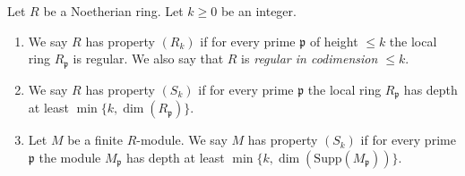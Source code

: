 \begin{definition}
\label{definition-conditions}
Let $R$ be a Noetherian ring.
Let $k \geq 0$ be an integer.
\begin{enumerate}
\item We say $R$ has property {\it $(R_k)$} if for every prime $\mathfrak p$
of height $\leq k$ the local ring $R_{\mathfrak p}$ is regular.
We also say that $R$ is {\it regular in codimension $\leq k$}.
\item We say $R$ has property {\it $(S_k)$} if for every prime $\mathfrak p$
the local ring $R_{\mathfrak p}$ has depth at least
$\min\{k, \dim(R_{\mathfrak p})\}$.
\item Let $M$ be a finite $R$-module. We say $M$ has property $(S_k)$
if for every prime $\mathfrak p$ the module
$M_{\mathfrak p}$ has depth at least
$\min\{k, \dim(\text{Supp}(M_{\mathfrak p}))\}$.
\end{enumerate}
\end{definition}